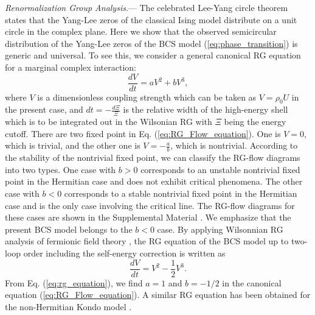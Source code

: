 \documentclass[aps,prl,twocolumn,nofootinbib,superscriptaddress,notitlepage,longbibliography]{revtex4-1}
\begin{document}
	\emph{Renormalization Group Analysis}.--- %
	The celebrated Lee-Yang circle theorem \cite{PhysRev.87.410} states that the Yang-Lee zeros of the classical Ising model distribute on a unit circle in the complex plane. Here we show that the observed semicircular distribution of the Yang-Lee zeros of the BCS model (\ref{eq:phase_transition}) is generic and universal. To see this, we consider a general canonical RG equation for a marginal complex interaction: 
	\begin{equation}
		\frac{dV}{dt}=aV^{2}+bV^{3},\label{eq:RG_Flow_equation}
	\end{equation}
	where $V$ is a dimensionless coupling strength which can be taken as $V=\rho_0U$ in the present case, and $dt=-\frac{d\Xi}{\Xi}$ is the relative width of the high-energy shell which is to be integrated out in the Wilsonian RG with $\Xi$ being the energy cutoff. There are two fixed point in Eq. (\ref{eq:RG_Flow_equation}). One is $V=0$, which is trivial, and the other one is $V=-\frac{a}{b}$, which is nontrivial. According to the stability of the nontrivial fixed point, we can classify the RG-flow diagrams into two types. %
	One case with $b>0$ corresponds to an unstable nontrivial fixed point in the Hermitian case and does not exhibit critical phenomena. The other case with $b<0$ corresponds to a stable nontrivial fixed point in the Hermitian case and is the only case involving the critical line. The RG-flow diagrams for these cases are shown in the Supplemental Material \cite{SupplementaryMaterial}. We emphasize that the present BCS model belongs to the $b<0$ case. By applying Wilsonnian RG analysis of fermionic field theory \cite{Shankar1994}, the RG equation of the BCS model up to two-loop order including the self-energy correction is written as \cite{SupplementaryMaterial}
	\begin{equation}
		\frac{dV}{dt}=V^{2}-\frac{1}{2}V^{3}.\label{eq:rg_equation}
	\end{equation} 
	 From Eq. (\ref{eq:rg_equation}), we find $a=1$ and $b=-1/2$ in the canonical equation (\ref{eq:RG_Flow_equation}). A similar RG equation has been obtained for the non-Hermitian Kondo model \cite{Nakagawa2018}. %
\end{document}
